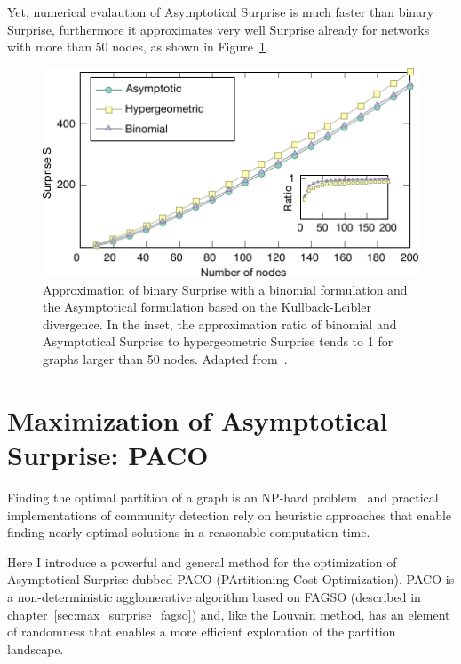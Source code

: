 Yet, numerical evalaution of Asymptotical Surprise is much faster than binary Surprise, furthermore it approximates very well Surprise already for networks with more than 50 nodes, as shown in Figure~\ref{fig:asymptotical_surprise_comparison}.

\begin{figure}[!htb]
\centering
\includegraphics[width=1\textwidth]{images/asymptotical_surprise_comparison.pdf}
\caption{Approximation of binary Surprise with a binomial formulation and the Asymptotical formulation based on the Kullback-Leibler divergence. In the inset, the approximation ratio of binomial and Asymptotical Surprise to hypergeometric Surprise tends to 1 for graphs larger than 50 nodes. Adapted from~\cite{traag2015}.}
\label{fig:asymptotical_surprise_comparison}
\end{figure}

\section{Maximization of Asymptotical Surprise: PACO}
Finding the optimal partition of a graph is an NP-hard problem~\cite{fortunato2010} and practical implementations of community detection rely on heuristic approaches that enable finding nearly-optimal solutions in a reasonable computation time.

Here I introduce a powerful and general method for the optimization of Asymptotical Surprise dubbed PACO (PArtitioning Cost Optimization).
PACO is a non-deterministic agglomerative algorithm based on FAGSO (described in chapter~\ref{sec:max_surprise_fagso}) and, like the Louvain method, has an element of randomness that enables a more efficient exploration of the partition landscape.

